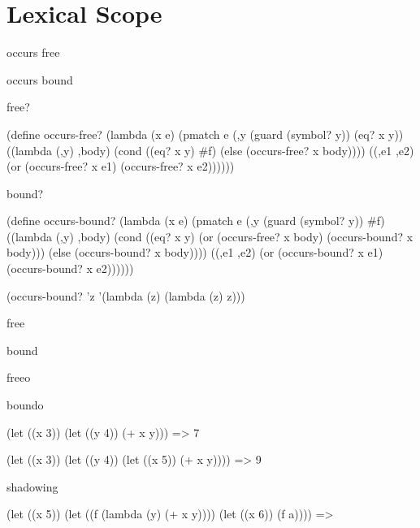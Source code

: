 \chapter{Lexical Scope}
\label{chap:scope}

occurs free

occurs bound

free?

(define occurs-free?
  (lambda (x e)
    (pmatch e
      (,y (guard (symbol? y))
       (eq? x y))
      ((lambda (,y) ,body)
       (cond
         ((eq? x y) #f)
         (else (occurs-free? x body))))
      ((,e1 ,e2)
       (or (occurs-free? x e1) (occurs-free? x e2))))))

bound?

(define occurs-bound?
  (lambda (x e)
    (pmatch e
      (,y (guard (symbol? y))
       #f)
      ((lambda (,y) ,body)
       (cond
         ((eq? x y) (or (occurs-free? x body) (occurs-bound? x body)))
         (else (occurs-bound? x body))))
      ((,e1 ,e2)
       (or (occurs-bound? x e1) (occurs-bound? x e2))))))

(occurs-bound? 'z '(lambda (z) (lambda (z) z)))

free

bound

freeo

boundo


(let ((x 3))
  (let ((y 4))
    (+ x y)))
=>
7

(let ((x 3))
  (let ((y 4))
    (let ((x 5))
      (+ x y))))
=>
9

shadowing

(let ((x 5))
  (let ((f (lambda (y) (+ x y))))
    (let ((x 6))
      (f a))))
=>
